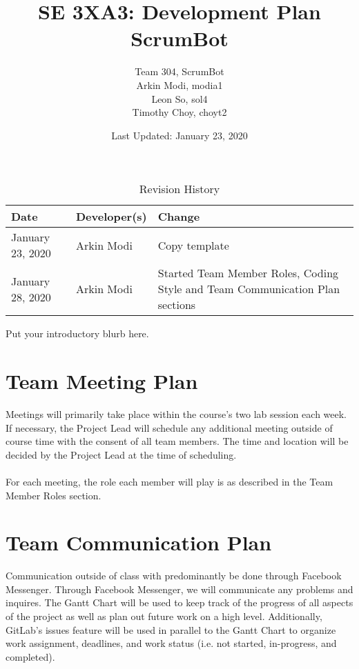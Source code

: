 \documentclass{article}
\title{SE 3XA3: Development Plan\\ScrumBot}
\author{
	Team 304, ScrumBot
		\\ Arkin Modi, modia1
        \\ Leon So, sol4
        \\ Timothy Choy, choyt2
}
\date{Last Updated: January 23, 2020}
\begin{document}
\begin{table}[hp]
    \caption{Revision History} \label{TblRevisionHistory}
    \begin{tabularx}{\textwidth}{llX}
        \toprule
            \textbf{Date} & \textbf{Developer(s)} & \textbf{Change}\\
        \midrule
            January 23, 2020 & Arkin Modi & Copy template\\
            January 28, 2020 & Arkin Modi & Started Team Member Roles, Coding Style and Team Communication Plan sections\\
        \bottomrule
    \end{tabularx}
\end{table}

\newpage

\maketitle

Put your introductory blurb here.

\section{Team Meeting Plan}
Meetings will primarily take place within the course's two lab session each week. If necessary, the Project Lead will schedule any additional meeting outside of course time with the consent of all team members. The time and location will be decided by the Project Lead at the time of scheduling. 
\\\\
\noindent For each meeting, the role each member will play is as described in the Team Member Roles section.

\section{Team Communication Plan}
Communication outside of class with predominantly be done through Facebook Messenger. Through Facebook Messenger, we will communicate any problems and inquires. The Gantt Chart will be used to keep track of the progress of all aspects of the project as well as plan out future work on a high level. Additionally, GitLab's issues feature will be used in parallel to the Gantt Chart to organize work assignment, deadlines, and work status (i.e. not started, in-progress, and completed).
\end{document}
